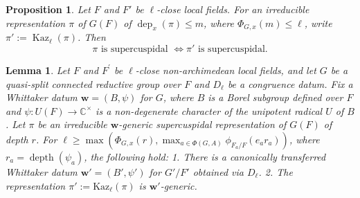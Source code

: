 \documentclass[10pt,a4paper]{amsart}
\newtheorem{proposition}{Proposition}
\newtheorem{lemma}{Lemma}
\DeclareMathOperator{\Kaz}{Kaz}
\DeclareMathOperator{\dep}{dep}
\begin{document}
\begin{proposition}
\label{prop:Kaz-preserves-SC}
Let $F$ and $F'$ be $\ell$-close local fields. For an irreducible representation $\pi$ of $G(F)$ of \(\dep_x(\pi)\leq m\), where \(\Phi_{G,x}(m)\leq \ell\), write $\pi':=\Kaz_{\ell}(\pi)$. Then
\[
     \pi \text{ is supercuspidal } \Longleftrightarrow \pi' \text{ is supercuspidal}.
\]
\end{proposition}

\begin{lemma}\label{lem:kaz-preserves-genericity}
Let \(F\) and \(F^{\prime}\) be \(\ell\)-close non-archimedean local fields, and let \(G\) be a quasi-split connected reductive group over \(F\) and \(D_\ell\) be a congruence datum. Fix a Whittaker datum \(\mathbf{w} = (B, \psi)\) for \(G\), where \(B\) is a Borel subgroup defined over \(F\) and \(\psi: U(F) \to \mathbb{C}^\times\) is a non-degenerate character of the unipotent radical \(U\) of \(B\). Let \(\pi\) be an irreducible \(\mathbf{w}\)-generic supercuspidal representation of \(G(F)\) of depth \(r\). For  \(\ell \geq \max\left( \Phi_{G,x}(r), \max_{a \in \Phi(G,A)} \phi_{F_a/F}(e_a r_a) \right)\), where \(r_a = \operatorname{depth}(\psi_a)\), the following hold:  
1. There is a canonically transferred Whittaker datum \(\mathbf{w}' = (B', \psi')\) for \(G'/F'\) obtained via \(D_\ell\). 
2. The representation \(\pi' := \mathrm{Kaz}_\ell(\pi)\) is \(\mathbf{w}'\)-generic.  
\end{lemma}
\end{document}
